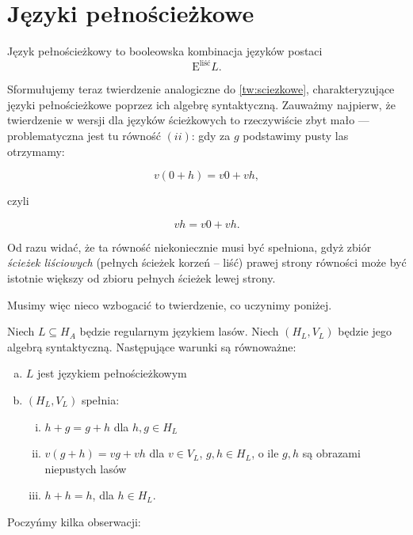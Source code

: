 \section{Języki pełnościeżkowe}%
\label{sec:jezyki_pelnosciezkowe}
\newcommand{\Elisc}{\ensuremath{\mathrm{E}^{\textrm{liść}}}}


\begin{definicja}
	Język pełnościeżkowy to booleowska kombinacja języków postaci
	$$\Elisc L.$$
\end{definicja}

Sformułujemy teraz twierdzenie analogiczne do \ref{tw:sciezkowe}, charakteryzujące języki pełnościeżkowe poprzez ich algebrę syntaktyczną. Zauważmy najpierw, że twierdzenie w wersji dla języków ścieżkowych to rzeczywiście zbyt mało --- problematyczna jest tu równość $(ii)$: gdy za $g$ podstawimy pusty las otrzymamy:

$$v(0+h) = v0 + vh,$$

czyli

$$vh = v0 + vh.$$

Od razu widać, że ta równość niekoniecznie musi być spełniona, gdyż zbiór \textit{ścieżek liściowych} (pełnych ścieżek korzeń -- liść) prawej strony równości może być istotnie większy od zbioru pełnych ścieżek lewej strony.

Musimy więc nieco wzbogacić to twierdzenie, co uczynimy poniżej.

\begin{twierdzenie}
	Niech $L \subseteq H_A$ będzie regularnym językiem lasów. Niech $(H_L, V_L)$ będzie jego algebrą syntaktyczną. Następujące warunki są równoważne:
	
	\begin{enumerate}[(a)]
		\item $L$ jest językiem pełnościeżkowym
		\item $(H_L, V_L)$ spełnia:
		\begin{enumerate}[(i)]
			\item $h + g = g + h$ dla $h,g \in H_L$\label{(i)}
			\item $v(g+h) = vg + vh$ dla $v \in V_L$, $g,h \in H_L$, o ile $g,h$ są obrazami niepustych lasów\label{(ii)}
			\item $h + h = h$, dla $h \in H_L$.\label{(iii)}
		\end{enumerate}
	\end{enumerate}
\end{twierdzenie}

Poczyńmy kilka obserwacji:

